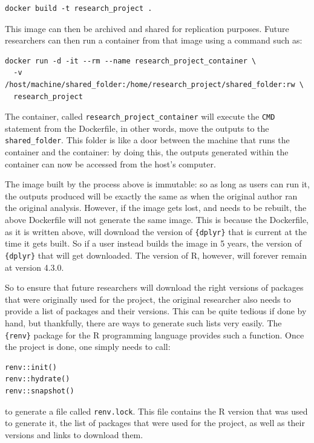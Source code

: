 \documentclass[
  letterpaper,
  DIV=11,
  numbers=noendperiod]{scrartcl}
\begin{document}
\begin{verbatim}
docker build -t research_project .
\end{verbatim}

This image can then be archived and shared for replication purposes.
Future researchers can then run a container from that image using a
command such as:

\begin{verbatim}
docker run -d -it --rm --name research_project_container \
  -v /host/machine/shared_folder:/home/research_project/shared_folder:rw \
  research_project
\end{verbatim}

The container, called \texttt{research\_project\_container} will execute
the \texttt{CMD} statement from the Dockerfile, in other words, move the
outputs to the \texttt{shared\_folder}. This folder is like a door
between the machine that runs the container and the container: by doing
this, the outputs generated within the container can now be accessed
from the host's computer.

The image built by the process above is immutable: so as long as users
can run it, the outputs produced will be exactly the same as when the
original author ran the original analysis. However, if the image gets
lost, and needs to be rebuilt, the above Dockerfile will not generate
the same image. This is because the Dockerfile, as it is written above,
will download the version of \texttt{\{dplyr\}} that is current at the
time it gets built. So if a user instead builds the image in 5 years,
the version of \texttt{\{dplyr\}} that will get downloaded. The version
of R, however, will forever remain at version 4.3.0.

So to ensure that future researchers will download the right versions of
packages that were originally used for the project, the original
researcher also needs to provide a list of packages and their versions.
This can be quite tedious if done by hand, but thankfully, there are
ways to generate such lists very easily. The \texttt{\{renv\}} package
for the R programming language provides such a function. Once the
project is done, one simply needs to call:

\begin{verbatim}
renv::init()
renv::hydrate()
renv::snapshot()
\end{verbatim}

to generate a file called \texttt{renv.lock}. This file contains the R
version that was used to generate it, the list of packages that were
used for the project, as well as their versions and links to download
them.
\end{document}
